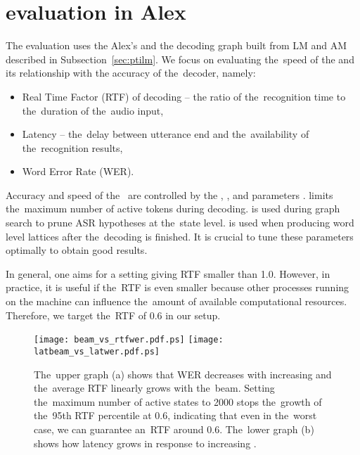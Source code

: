 \section{ evaluation in Alex}
\label{sec:eval}
The evaluation uses the Alex's  and the decoding graph built from \ac{LM} and \ac{AM} described in Subsection~\ref{sec:ptilm}.
We focus on evaluating the~speed of the  and its relationship with the accuracy of the~decoder, namely:
\begin{itemize}
    \item Real Time Factor (RTF) of decoding -- the ratio of the~recognition time to the~duration of the~audio input,
    \item Latency -- the~delay between utterance end and the~availability of the~recognition results,
    \item Word Error Rate (WER).
\end{itemize}

Accuracy and speed of the~ are controlled by the ,   , and  parameters \cite{povey2011kaldi}.
 limits the~maximum number of active tokens during decoding.
 is used during graph search to prune ASR hypotheses at the~state level.
 is used when producing word level lattices after the~decoding is finished.
It is crucial to tune these parameters optimally to obtain good results.

In general, one aims for a setting giving RTF smaller than 1.0.
However, in practice, it is useful if the~RTF is even smaller because other processes running on the machine can influence the~amount of available computational resources.
Therefore, we target the~RTF of 0.6 in our setup.

\begin{figure*}[t]
    \begin{center}
    \texttt{[image: beam\_vs\_rtfwer.pdf.ps]}
    \texttt{[image: latbeam\_vs\_latwer.pdf.ps]}
    \caption{The~upper graph (a) shows that WER decreases with increasing  and the~average RTF linearly grows with the~beam.
    Setting the~maximum number of active states to 2000 stops the~growth of the~95th RTF percentile at 0.6, indicating that even in the~worst case, we can guarantee an~RTF around 0.6.
    The~lower graph (b) shows how latency grows in response to increasing .}
    \label{fig:wer} 
    \end{center}
\end{figure*}

